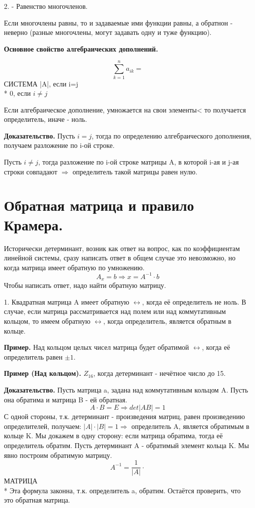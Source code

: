 \documentclass{article}
\begin{document}
2. - Равенство многочленов.

Если многочлены равны, то и задаваемые ими функции равны, а обратнон - неверно (разные многочлены, могут задавать одну и туже функцию).

{\bf Основное свойство алгебраических дополнений.}

$$\sum_{k=1}^n a_{ik}=$$ 
СИСТЕМА |A|, если i=j\\*
0, если $i\ne j$

Если алгебраическое дополнение, умножается на свои элементы< то получается определитель, иначе - ноль.

{\bf Доказательство.} Пусть $i=j$, тогда по определению алгебраического дополнения, получаем разложение по i-ой строке.

Пусть $i\ne j$, тогда разложение по i-ой строке матрицы A, в которой i-ая и j-ая строки совпадают $\Rightarrow$ определитель такой  матрицы равен нулю.
\section*{Обратная матрица и правило Крамера.}
Исторически детерминант, возник как ответ на вопрос, как по коэффициентам линейной системы, сразу написать ответ в общем случае это невозможно, но когда матрица имеет обратную по умножению. $$A_x=b\Rightarrow x=A^{-1}\cdot b$$
Чтобы написать ответ, надо найти обратную матрицу.

1. Квадратная матрица A имеет обратную $\leftrightarrow$, когда её определитель не ноль. В случае, если матрица рассматривается над полем или над коммутативным кольцом, то имеем обратную $\leftrightarrow$, когда определитель, является обратным в кольце.

{\bf Пример.} Над кольцом целых чисел матрица будет обратимой $\leftrightarrow$, когда её определитель равен $\pm 1$.

{\bf Пример (Над кольцом).} $Z_{16}$, когда детерминант - нечётное число до 15.

{\bf Доказательство.} Пусть матрица a, задана над коммутативным кольцом A. Пусть она обратима и матрица B - ей обратная.
$$A\cdot B=E\Rightarrow det|AB|=1$$
С одной стороны, т.к. детерминант - произведения матриц, равен произведению определителей, получаем: $|A|\cdot |B|=1\Rightarrow$ определитель A, является обратимым в кольце K. Мы докажем в одну сторону: если матрица обратима, тогда её определитель обратим. Пусть детерминант A - обратимый элемент кольца K. Мы явно построим обратимую матрицу.
$$A^{-1}=\frac{1}{|A|}\cdot$$ МАТРИЦА\\*
Эта формула законна, т.к. определитель a, обратим. Остаётся проверить, что это обратная матрица.
\end{document}
